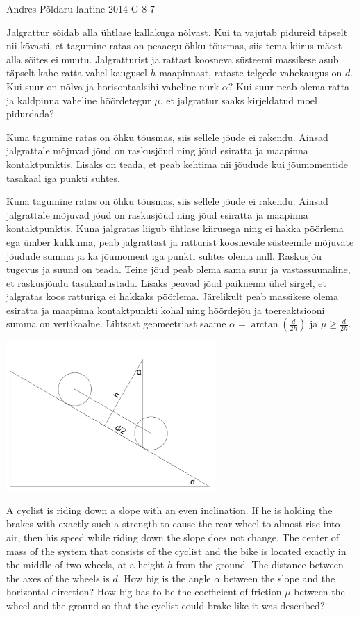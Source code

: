 {Andres Põldaru} %
{lahtine} %
{2014} %
{G 8} %
{7} %
{
\ifStatement
Jalgrattur sõidab alla ühtlase kallakuga nõlvast. Kui ta vajutab pidureid täpselt nii kõvasti, et tagumine ratas on peaaegu õhku tõusmas, siis tema kiirus mäest alla sõites ei muutu. Jalgratturist ja rattast koosneva süsteemi massikese asub täpselt kahe ratta vahel kaugusel $h$ maapinnast, rataste telgede vahekaugus on $d$. Kui suur on nõlva ja horisontaalsihi vaheline nurk $\alpha$? Kui suur peab olema ratta ja kaldpinna vaheline hõõrdetegur $\mu$, et jalgrattur saaks kirjeldatud moel pidurdada?
\fi


\ifHint
Kuna tagumine ratas on õhku tõusmas, siis sellele jõude ei rakendu. Ainsad jalgrattale mõjuvad jõud on raskusjõud ning jõud esiratta ja maapinna kontaktpunktis. Lisaks on teada, et peab kehtima nii jõudude kui jõumomentide tasakaal iga punkti suhtes.
\fi


\ifSolution
Kuna tagumine ratas on õhku tõusmas, siis sellele jõude ei rakendu. Ainsad jalgrattale mõjuvad jõud on raskusjõud ning jõud esiratta ja maapinna kontaktpunktis. Kuna jalgratas liigub ühtlase kiirusega ning ei hakka pöörlema ega ümber kukkuma, peab jalgrattast ja ratturist koosnevale süsteemile mõjuvate jõudude summa ja ka jõumoment iga punkti suhtes olema null. Raskusjõu tugevus ja suund on teada. Teine jõud peab olema sama suur ja vastassuunaline, et raskusjõudu tasakaalustada. Lisaks peavad jõud paiknema ühel sirgel, et jalgratas koos ratturiga ei hakkaks pöörlema. Järelikult peab massikese olema esiratta ja maapinna kontaktpunkti kohal ning hõõrdejõu ja toereaktsiooni summa on vertikaalne. Lihtsast geomeetriast saame $\alpha=\arctan(\frac{d}{2h})$ ja $\mu\ge\frac{d}{2h}$.
\begin{center}
\includegraphics[width=0.6\textwidth]{2014-lahg-08-ratas}
\end{center}
\fi


\ifEngStatement
A cyclist is riding down a slope with an even inclination. If he is holding the brakes with exactly such a strength to cause the rear wheel to almost rise into air, then his speed while riding down the slope does not change. The center of mass of the system that consists of the cyclist and the bike is located exactly in the middle of two wheels, at a height $h$ from the ground. The distance between the axes of the wheels is $d$. How big is the angle $\alpha$ between the slope and the horizontal direction? How big has to be the coefficient of friction $\mu$ between the wheel and the ground so that the cyclist could brake like it was described?
\fi


}
